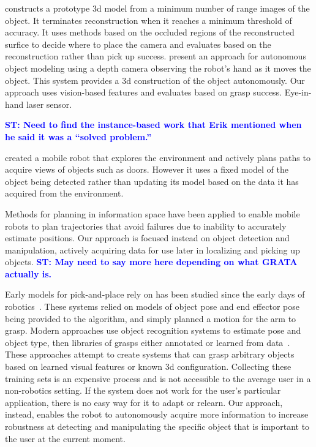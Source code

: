 \documentclass[conference]{IEEEtran}
\newcommand{\stnote}[1]{\textcolor{blue}{\textbf{ST: #1}}}
\begin{document}
\citet{banta00} constructs a prototype 3d model from a minimum number
of range images of the object.  It terminates reconstruction when it
reaches a minimum threshold of accuracy.  It uses methods based on the
occluded regions of the reconstructed surfice to decide where to place
the camera and evaluates based on the reconstruction rather than pick
up success.  \citet{krainin11} present an approach for autonomous
object modeling using a depth camera observing the robot's hand as it
moves the object.  This system provides a 3d construction of the
object autonomously.  Our approach uses vision-based features and
evaluates based on grasp success.  Eye-in-hand laser
sensor.~\citep{aeotti14}

\stnote{Need to find the instance-based work that Erik mentioned when
  he said it was a ``solved problem.''}

\citet{velez11} created a mobile robot that explores the environment
and actively plans paths to acquire views of objects such as doors.
However it uses a fixed model of the object being detected rather than
updating its model based on the data it has acquired from the
environment.

Methods for planning in information space \citep{he08, atanasov13,
  prentice09} have been applied to enable mobile robots to plan
trajectories that avoid failures due to inability to accurately
estimate positions.  Our approach is focused instead on
object detection and manipulation, actively acquiring data for use
later in localizing and picking up objects. \stnote{May need to say
  more here depending on what GRATA actually is.}


Early models for pick-and-place rely on has been studied since the
early days of robotics~\citep{brooks83, lozano89}.  These systems
relied on models of object pose and end effector pose being provided to the
algorithm, and simply planned a motion for the arm to grasp.  Modern
approaches use object recognition systems to estimate pose and object
type, then libraries of grasps either annotated or learned from
data~\citep{saxena08, goldfeder09, morales03}.  These approaches
attempt to create systems that can grasp arbitrary objects based on
learned visual features or known 3d configuration.  Collecting these
training sets is an expensive process and is not accessible to the
average user in a non-robotics setting.  If the system does not work
for the user's particular application, there is no easy way for it to
adapt or relearn.  Our approach, instead, enables the robot to
autonomously acquire more information to increase robustness at
detecting and manipulating the specific object that is important to
the user at the current moment.
\end{document}
